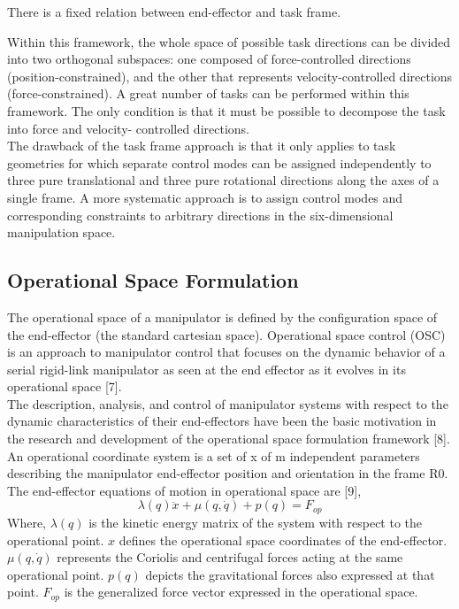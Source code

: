 There is a fixed relation between end-effector and task frame.    
{\color{green} 
Within this framework, the whole space of possible task directions can be divided into two orthogonal subspaces: one composed of force-controlled directions (position-constrained), and the other that represents velocity-controlled directions (force-constrained). A great number of tasks can be performed within this framework. The only condition is that it must be possible to decompose the task into force and velocity- controlled directions. \\ 

The drawback of the task frame approach is that it only applies to task geometries for which separate control modes can be assigned independently to three pure translational and three pure rotational directions along the axes of a single frame. A more systematic approach is to assign control modes and corresponding constraints to arbitrary directions in the six-dimensional manipulation space.

\subsection{Operational Space Formulation}
The operational space of a manipulator is defined by the configuration space of the end-effector (the standard cartesian space). Operational space control (OSC) is an approach to manipulator control that focuses on the dynamic behavior of a serial rigid-link manipulator as seen at the end effector as it evolves in its operational space [7]. \\ The description, analysis, and control of manipulator systems with respect to the dynamic characteristics of their end-effectors have been the basic motivation in the research and development of the operational space formulation framework [8]. \\ An operational coordinate system is a set of x of m independent parameters describing the manipulator end-effector position and orientation in the frame R0. The end-effector equations of motion in operational space are [9],\\
\textbf{$$ \lambda(q) \ddot{x} + \mu (q, \dot q) + p(q) = F_{op} $$}
Where, $\lambda (q)$ is the kinetic energy matrix of the system with respect to the operational point. $x$ defines the operational space coordinates of the end-effector.\\	
$\mu (q, \dot q)$ represents the Coriolis and centrifugal forces acting at the same operational point. $p(q)$ depicts the gravitational forces also expressed at that point.	$F_{op}$ is the generalized force vector expressed in the operational space.


}
